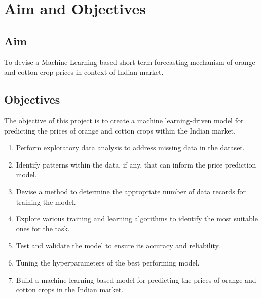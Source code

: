 \section{Aim and Objectives}

\subsection{Aim}
    To devise a Machine Learning based short-term forecasting mechanism of orange and cotton crop prices in context of Indian market.

\subsection{Objectives}
    The objective of this project is to create a machine learning-driven model for predicting the prices of orange and cotton crops within the Indian market.
    \begin{enumerate}
        \item
            Perform exploratory data analysis to address missing data in the dataset.
        \item
            Identify patterns within the data, if any, that can inform the price prediction model.
        \item
            Devise a method to determine the appropriate number of data records for training the model.
        \item
            Explore various training and learning algorithms to identify the most suitable ones for the task.
        \item
            Test and validate the model to ensure its accuracy and reliability.
        \item
            Tuning the hyperparameters of the best performing model.
        \item
            Build a machine learning-based model for predicting the prices of orange and cotton crops in the Indian market.
    \end{enumerate}
